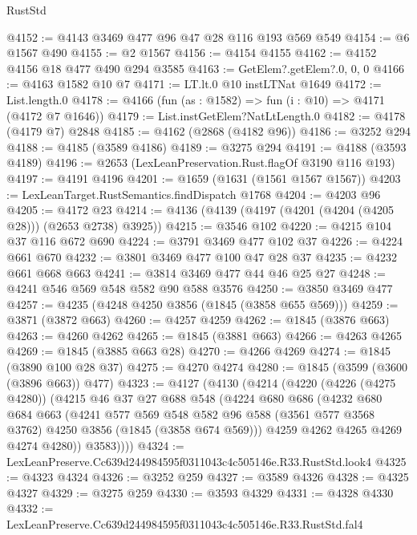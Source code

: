 \begin{lexlean}{RustStd}
\begin{coremodule}
@4152 := @4143 @3469 @477 @96 @47 @28 @116 @193 @569 @549
@4154 := @6 @1567 @490
@4155 := @2 @1567
@4156 := @4154 @4155
@4162 := @4152 @4156 @18 @477 @490 @294 @3585
@4163 := GetElem?.getElem?.{0, 0, 0}
@4166 := @4163 @1582 @10 @7
@4171 := LT.lt.{0} @10 instLTNat @1649
@4172 := List.length.{0}
@4178 := @4166 (fun (as : @1582) => fun (i : @10) => @4171 (@4172 @7 @1646))
@4179 := List.instGetElem?NatLtLength.{0}
@4182 := @4178 (@4179 @7) @2848
@4185 := @4162 (@2868 (@4182 @96))
@4186 := @3252 @294
@4188 := @4185 (@3589 @4186)
@4189 := @3275 @294
@4191 := @4188 (@3593 @4189)
@4196 := @2653 (LexLeanPreservation.Rust.flagOf @3190 @116 @193)
@4197 := @4191 @4196
@4201 := @1659 (@1631 (@1561 @1567 @1567))
@4203 := LexLeanTarget.RustSemantics.findDispatch @1768
@4204 := @4203 @96
@4205 := @4172 @23
@4214 := @4136 (@4139 (@4197 (@4201 (@4204 (@4205 @28))) (@2653 @2738) @3925))
@4215 := @3546 @102
@4220 := @4215 @104 @37 @116 @672 @690
@4224 := @3791 @3469 @477 @102 @37
@4226 := @4224 @661 @670
@4232 := @3801 @3469 @477 @100 @47 @28 @37
@4235 := @4232 @661 @668 @663
@4241 := @3814 @3469 @477 @44 @46 @25 @27
@4248 := @4241 @546 @569 @548 @582 @90 @588 @3576
@4250 := @3850 @3469 @477
@4257 := @4235 (@4248 @4250 @3856 (@1845 (@3858 @655 @569)))
@4259 := @3871 (@3872 @663)
@4260 := @4257 @4259
@4262 := @1845 (@3876 @663)
@4263 := @4260 @4262
@4265 := @1845 (@3881 @663)
@4266 := @4263 @4265
@4269 := @1845 (@3885 @663 @28)
@4270 := @4266 @4269
@4274 := @1845 (@3890 @100 @28 @37)
@4275 := @4270 @4274
@4280 := @1845 (@3599 (@3600 (@3896 @663)) @477)
@4323 := @4127
    (@4130
      (@4214
        (@4220
          (@4226 (@4275 @4280))
          (@4215
            @46
            @37
            @27
            @688
            @548
            (@4224
              @680
              @686
              (@4232
                @680
                @684
                @663
                (@4241
                  @577
                  @569
                  @548
                  @582
                  @96
                  @588
                  (@3561 @577 @3568 @3762)
                  @4250
                  @3856
                  (@1845 (@3858 @674 @569)))
                @4259
                @4262
                @4265
                @4269
                @4274
                @4280))
            @3583))))
@4324 := LexLeanPreserve.Cc639d244984595f0311043c4c505146e.R33.RustStd.look4
@4325 := @4323 @4324
@4326 := @3252 @259
@4327 := @3589 @4326
@4328 := @4325 @4327
@4329 := @3275 @259
@4330 := @3593 @4329
@4331 := @4328 @4330
@4332 := LexLeanPreserve.Cc639d244984595f0311043c4c505146e.R33.RustStd.fal4

\end{coremodule}
\end{lexlean}
